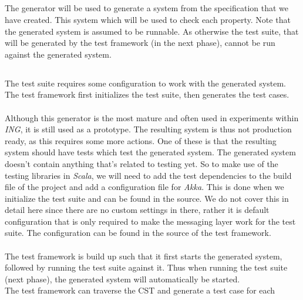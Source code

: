 \subsection{\tfPhaseThree{}}
The generator will be used to generate a system from the specification that we
have created. This system which will be used to check each property. Note that
the generated system is assumed to be runnable. As otherwise the test suite,
that will be generated by the test framework (in the next phase), cannot be run
against the generated system.

\subsection{\tfPhaseFour{}}
\label{sct:3_tf_phase_four}
The test suite requires some configuration to work with the generated system.
The test framework first initializes the test suite, then generates the test
cases.\\
\\
Although this generator is the most mature and often used in experiments within
\textit{ING}, it is still used as a prototype. The resulting system is thus not
production ready, as this requires some more actions. One of these is that the
resulting system should have tests which test the generated system. The
generated system doesn't contain anything that's related to testing yet. So to
make use of the testing libraries in \textit{Scala}, we will need to add the
test dependencies to the build file of the project and add a configuration file
for \textit{Akka}. This is done when we initialize the test suite and can be
found in the source. We do not cover this in detail here since there are no
custom settings in there, rather it is default configuration that is only
required to make the messaging layer work for the test suite. The configuration
can be found in the source of the test framework.\\
\\
The test framework is build up such that it first starts the generated system,
followed by running the test suite against it. Thus when running the test suite
(next phase), the generated system will automatically be started.
\\
The test framework can traverse the CST and generate a test case for each

